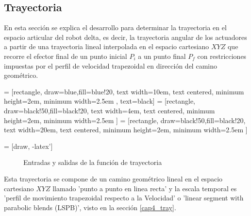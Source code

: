     \newpage

    \subsection{Trayectoria}
    
    En esta sección se explica el desarrollo para determinar la trayectoria en el espacio articular del robot delta, es decir, la trayectoria angular de los actuadores a partir de una trayectoria lineal interpolada en el espacio cartesiano $XYZ$ que recorre el efector final de un punto inicial $P_i$ a un punto final $P_f$ con restricciones impuestas por el perfil de velocidad trapezoidal en dirección del camino geométrico.

         = [rectangle, draw=blue,fill=blue!20, text width=10em, text centered, minimum height=2em, minimum width=2.5em , text=black]
         = [rectangle, draw=black!50,fill=black!20, text width=4em, text centered, minimum height=2em, minimum width=2.5em ]
         = [rectangle, draw=black!50,fill=black!20, text width=20em, text centered, minimum height=2em, minimum width=2.5em ]

         = [draw, -latex']
         \begin{center}
         \begin{figure}[htb]
                \caption{Entradas y salidas de la función de trayectoria}
                \label{f:cap6_trayectory_1}
         \end{figure}
         \end{center}
         
        \vspace{-1cm}   

        
    Esta trayectoria se compone de un camino geométrico lineal en el espacio cartesiano $XYZ$ llamado 'punto a punto en linea recta' y la escala temporal es 'perfil de movimiento trapezoidal respecto a la Velocidad' o 'linear segment with parabolic blends (LSPB)', visto en la sección \eqref{cap4_tray}. 
    
